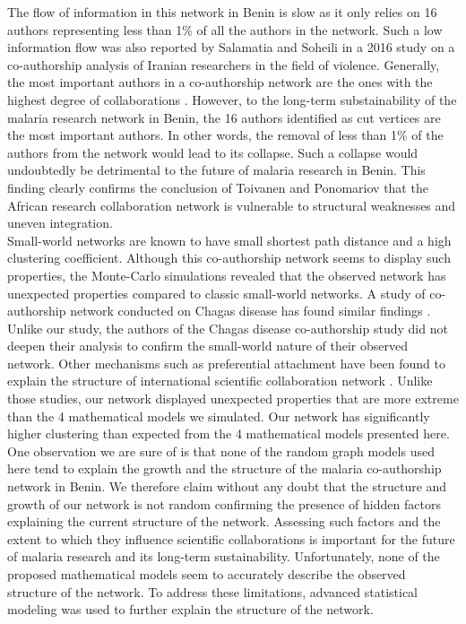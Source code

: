 The flow of information in this network in Benin is slow as it only relies on 16 authors representing less than 1\% of all the authors in the network. Such a low information flow was also reported by Salamatia and Soheili \cite{salamati_social_2016} in a 2016 study on a co-authorship analysis of Iranian researchers in the field of violence. Generally, the most important authors in a co-authorship network are the ones with the highest degree of collaborations \cite{bales_social_2008, bales_evolution_2011}. However, to the long-term substainability of the malaria research network in Benin, the 16 authors identified as cut vertices are the most important authors. In other words, the removal of less than 1\% of the authors from the network would lead to its collapse. Such a collapse would undoubtedly be detrimental to the future of malaria research in Benin. This finding clearly confirms the conclusion of Toivanen and Ponomariov \cite{toivanen_african_2011} that the African research collaboration network is vulnerable to structural weaknesses and uneven integration.\\%
Small-world networks are known to have small shortest path distance and a high clustering coefficient. Although this co-authorship network seems to display such properties, the Monte-Carlo simulations revealed that the observed network has unexpected properties compared to classic small-world networks. A study of co-authorship network conducted on Chagas disease has found similar findings \cite{gonzalez-alcaide_scientific_2012}. Unlike our study, the authors of the Chagas disease co-authorship study did not deepen their analysis to confirm the small-world nature of their observed network. Other mechanisms such as preferential attachment have been found to explain the structure of international scientific collaboration network \cite{wagner_network_2005}. Unlike those studies, our network displayed unexpected properties that are more extreme than the 4 mathematical models we simulated. Our network has significantly higher clustering than expected from the 4 mathematical models presented here. One observation we are sure of is that none of the random graph models used here tend to explain the growth and the structure of the malaria co-authorship network in Benin. We therefore claim without any doubt that the structure and growth of our network is not random confirming the presence of hidden factors explaining the current structure of the network. Assessing such factors and the extent to which they influence scientific collaborations is important for the future of malaria research and its long-term sustainability. Unfortunately, none of the proposed mathematical models seem to accurately describe the observed structure of the network. To address these limitations, advanced statistical modeling was used to further explain the structure of the network. \\%
